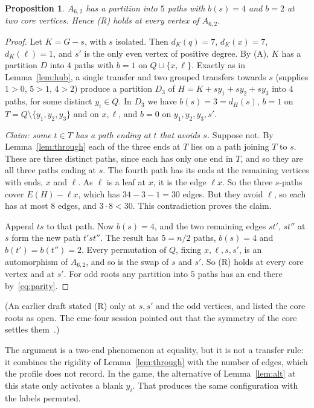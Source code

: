 \documentclass[11pt]{amsart}
\newtheorem{proposition}[theorem]{Proposition}
\theoremstyle{definition}
\begin{document}
\begin{proposition}\label{prop:A62}
$A_{6,2}$ has a partition into $5$ paths with $b(s)=4$ and $b=2$ at two core vertices. Hence (R)
holds at every vertex of $A_{6,2}$.
\end{proposition}
\begin{proof}
Let $K=G-s$, with $s$ isolated. Then $d_K(q)=7$, $d_K(x)=7$, $d_K(\ell)=1$, and $s'$ is the only
even vertex of positive degree. By (A), $K$ has a partition $D$ into $4$ paths with $b=1$ on
$Q\cup\{x,\ell\}$. Exactly as in Lemma~\ref{lem:hub}, a single transfer and two grouped transfers
towards $s$ (supplies $1>0$, $5>1$, $4>2$) produce a partition $D_3$ of $H=K+sy_1+sy_2+sy_3$ into
$4$ paths, for some distinct $y_i\in Q$. In $D_3$ we have $b(s)=3=d_H(s)$, $b=1$ on
$T=Q\setminus\{y_1,y_2,y_3\}$ and on $x,\ell$, and $b=0$ on $y_1,y_2,y_3,s'$.

\emph{Claim: some $t\in T$ has a path ending at $t$ that avoids $s$.} Suppose not. By
Lemma~\ref{lem:through} each of the three ends at $T$ lies on a path joining $T$ to $s$. These are
three distinct paths, since each has only one end in $T$, and so they are all three paths ending at
$s$. The fourth path has its ends at the remaining vertices with ends, $x$ and $\ell$. As $\ell$ is
a leaf at $x$, it is the edge $\ell x$. So the three $s$-paths cover $E(H)-\ell x$, which has
$34-3-1=30$ edges. But they avoid $\ell$, so each has at most $8$ edges, and $3\cdot8<30$. This
contradiction proves the claim.

Append $ts$ to that path. Now $b(s)=4$, and the two remaining edges $st'$, $st''$ at $s$ form the
new path $t'st''$. The result has $5=n/2$ paths, $b(s)=4$ and $b(t')=b(t'')=2$. Every permutation
of $Q$, fixing $x,\ell,s,s'$, is an automorphism of $A_{6,2}$, and so is the swap of $s$ and $s'$.
So (R) holds at every core vertex and at $s'$. For odd roots any partition into $5$ paths has an end
there by~\eqref{eq:parity}.
\end{proof}
(An earlier draft stated (R) only at $s,s'$ and the odd vertices, and listed the core roots as open.
The emc-four session pointed out that the symmetry of the core settles them~\cite[\S7]{ES}.)

The argument is a two-end phenomenon at equality, but it is not a transfer rule: it combines the
rigidity of Lemma~\ref{lem:through} with the number of edges, which the profile does not record.
In the game, the alternative of Lemma~\ref{lem:alt} at this state only activates a blank $y_i$. That
produces the same configuration with the labels permuted.
\end{document}
